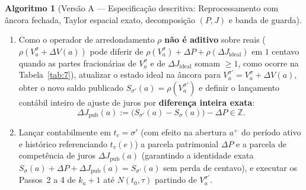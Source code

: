 \documentclass[11pt, a4paper]{article}
\theoremstyle{definition}
\newtheorem{algoritmo}[definicao]{Algoritmo}
\theoremstyle{plain}
\theoremstyle{remark}
\begin{document}
\begin{algoritmo}[Versão A — Especificação descritiva: Reprocessamento com âncora fechada, Taylor espacial exato, decomposição $(P, J)$ e banda de guarda]
\begin{enumerate}[label=\textbf{\arabic*.}]
\begin{enumerate}[label=(\alph*)]
        \item Como o operador de arredondamento $\rho$ \textbf{não é aditivo} sobre reais ($\rho(V_a^\sigma + \Delta V(a))$ pode diferir de $\rho(V_a^\sigma) + \Delta P + \rho(\Delta J_{\text{ideal}})$ em $1$ centavo quando as partes fracionárias de $V_a^\sigma$ e de $\Delta J_{\text{ideal}}$ somam $\ge 1$, como ocorre na Tabela~\ref{tab:7}), atualizar o estado ideal na âncora para $V_a^{\sigma'} = V_a^\sigma + \Delta V(a)$, obter o novo saldo publicado $S_{\sigma'}(a) = \rho(V_a^{\sigma'})$ e definir o lançamento contábil inteiro de ajuste de juros por \textbf{diferença inteira exata}:
        \[
        \Delta J_{\text{pub}}(a) := \big(S_{\sigma'}(a) - S_\sigma(a)\big) - \Delta P \in \mathbb{Z}.
        \]
        \item Lançar contabilmente em $t_c = \sigma'$ (com efeito na abertura $a^+$ do período ativo e histórico referenciando $t_v(e)$) a parcela patrimonial $\Delta P$ e a parcela de competência de juros $\Delta J_{\text{pub}}(a)$ (garantindo a identidade exata $S_\sigma(a) + \Delta P + \Delta J_{\text{pub}}(a) = S_{\sigma'}(a)$ sem perda de centavo), e executar os Passos~2 a 4 de $k_a + 1$ até $N(t_0, \tau)$ partindo de $V_a^{\sigma'}$.
    \end{enumerate}
\end{enumerate}
\end{algoritmo}
\end{document}
